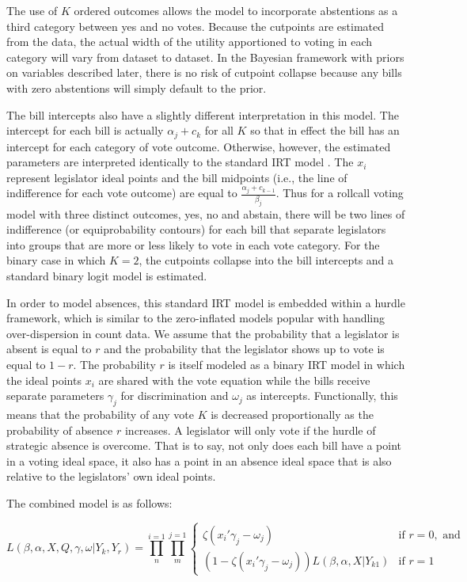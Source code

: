 	The use of $K$ ordered outcomes allows the model to incorporate abstentions as a third category between yes and no votes. Because the cutpoints are estimated from the data, the actual width of the utility apportioned to voting in each category will vary from dataset to dataset. In the Bayesian framework with priors on variables described later, there is no risk of cutpoint collapse because any bills with zero abstentions will simply default to the prior.
	
	The bill intercepts also have a slightly different interpretation in this model. The intercept for each bill is actually $\alpha_j + c_k$ for all $K$ so that in effect the bill has an intercept for each category of vote outcome. Otherwise, however, the estimated parameters are interpreted identically to the standard IRT model \parencite{jackman2004}. The $x_i$ represent legislator ideal points and the bill midpoints (i.e., the line of indifference for each vote outcome) are equal to $\frac{\alpha_j + c_{k-1}}{\beta_j}$. Thus for a rollcall voting model with three distinct outcomes, yes, no and abstain, there will be two lines of indifference (or equiprobability contours) for each bill that separate legislators into groups that are more or less likely to vote in each vote category. For the binary case in which $K=2$, the cutpoints collapse into the bill intercepts and a standard binary logit model is estimated.
	
	In order to model absences, this standard IRT model is embedded within a hurdle framework, which is similar to the zero-inflated models popular with handling over-dispersion in count data. We assume that the probability that a legislator is absent is equal to $r$ and the probability that the legislator shows up to vote is equal to $1-r$. The probability $r$ is itself modeled as a binary IRT model in which the ideal points $x_i$ are shared with the vote equation while the bills receive separate parameters $\gamma_j$ for discrimination and $\omega_j$ as intercepts. Functionally, this means that the probability of any vote $K$ is decreased proportionally as the probability of absence $r$ increases. A legislator will only vote if the hurdle of strategic absence is overcome. That is to say, not only does each bill have a point in a voting ideal space, it also has a point in an absence ideal space that is also relative to the legislators' own ideal points.
	
	The combined model is as follows:
	
		 \[
	L(\beta,\alpha,X,Q,\gamma,\omega|Y_{k},Y_{r}) = 
	\prod_{n}^{i=1} \prod_{m}^{j=1}
	\begin{cases}
	\zeta(x_{i}'\gamma_j - \omega_j ) & \text{if } r=0, \text{ and} \\
	(1-\zeta({x_{i}'\gamma_j - \omega_j}))L(\beta,\alpha,X|Y_{k1}) & \text{if } r=1
	\end{cases}
	\]
	
